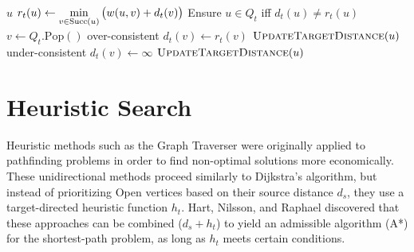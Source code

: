 {\begin{algorithm}[t]
\begin{minipage}[t]{8.2cm}
\begin{algorithmic}[1]
          {$u$}
               \State $r_t(u) \gets \displaystyle\min_{v \in \mbox{\scriptsize Succ}(u)}
                  \big( w(u,v) + d_t(v) \big)$
            \EndIf
            \State Ensure $u \in Q_t$ iff $d_t(u) \neq r_t(u)$
         \EndProcedure
          {\,\!}
            \State $v \gets Q_t.\mbox{Pop}()$
                  \Comment over-consistent
               \State $d_t(v) \gets r_t(v)$
                  \State $\mbox{\sc UpdateTargetDistance}(u)$
               \EndFor
            \Else
                  \Comment under-consistent
               \State $d_t(v) \gets \infty$
                  \State $\mbox{\sc UpdateTargetDistance}(u)$
               \EndFor
            \EndIf
         \EndProcedure
      \end{algorithmic}
   \end{minipage}
\end{algorithm}
} %

\section{Heuristic Search}
\label{sec:ibid:heuristic}

Heuristic methods such as the Graph Traverser
\citep{doran1966graphtraverser} were originally
applied to pathfinding problems in order to find non-optimal
solutions more economically.
These unidirectional methods proceed similarly to Dijkstra's algorithm,
but instead of prioritizing {\sc Open} vertices
based on their source distance $d_s$,
they use a target-directed heuristic function $h_t$.
Hart, Nilsson, and Raphael \citep{hart1968astar} discovered that
these approaches can be combined ($d_s + h_t$) to yield
an admissible algorithm (A*) for the shortest-path problem,
as long as $h_t$ meets certain conditions.

